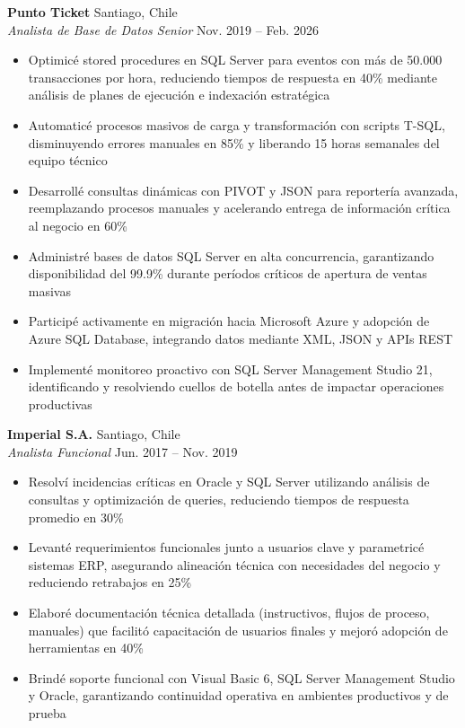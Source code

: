\documentclass[11pt,letterpaper]{article}
\begin{document}
\textbf{Punto Ticket} \hfill Santiago, Chile\\
\textit{Analista de Base de Datos Senior} \hfill Nov. 2019 – Feb. 2026
\begin{itemize}
  \item Optimicé stored procedures en SQL Server para eventos con más de 50.000 transacciones por hora, reduciendo tiempos de respuesta en 40\% mediante análisis de planes de ejecución e indexación estratégica
  \item Automaticé procesos masivos de carga y transformación con scripts T-SQL, disminuyendo errores manuales en 85\% y liberando 15 horas semanales del equipo técnico
  \item Desarrollé consultas dinámicas con PIVOT y JSON para reportería avanzada, reemplazando procesos manuales y acelerando entrega de información crítica al negocio en 60\%
  \item Administré bases de datos SQL Server en alta concurrencia, garantizando disponibilidad del 99.9\% durante períodos críticos de apertura de ventas masivas
  \item Participé activamente en migración hacia Microsoft Azure y adopción de Azure SQL Database, integrando datos mediante XML, JSON y APIs REST
  \item Implementé monitoreo proactivo con SQL Server Management Studio 21, identificando y resolviendo cuellos de botella antes de impactar operaciones productivas
\end{itemize}
\vspace{2pt}
\textbf{Imperial S.A.} \hfill Santiago, Chile\\
\textit{Analista Funcional} \hfill Jun. 2017 – Nov. 2019
\begin{itemize}
  \item Resolví incidencias críticas en Oracle y SQL Server utilizando análisis de consultas y optimización de queries, reduciendo tiempos de respuesta promedio en 30\%
  \item Levanté requerimientos funcionales junto a usuarios clave y parametricé sistemas ERP, asegurando alineación técnica con necesidades del negocio y reduciendo retrabajos en 25\%
  \item Elaboré documentación técnica detallada (instructivos, flujos de proceso, manuales) que facilitó capacitación de usuarios finales y mejoró adopción de herramientas en 40\%
  \item Brindé soporte funcional con Visual Basic 6, SQL Server Management Studio y Oracle, garantizando continuidad operativa en ambientes productivos y de prueba
\end{itemize}
\end{document}

